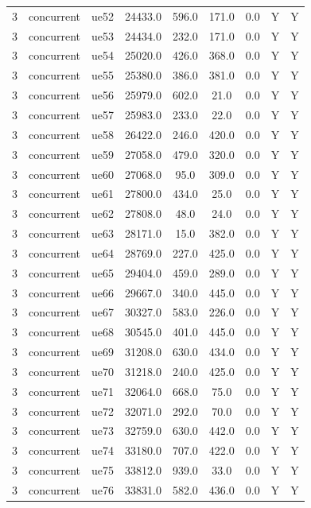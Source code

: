\begin{table}[ht]
\begin{tabular}{|c|c|c|c|c|c|c|c|c|}
3 & concurrent & ue52 & 24433.0 & 596.0 & 171.0 & 0.0 & Y & Y \\
3 & concurrent & ue53 & 24434.0 & 232.0 & 171.0 & 0.0 & Y & Y \\
3 & concurrent & ue54 & 25020.0 & 426.0 & 368.0 & 0.0 & Y & Y \\
3 & concurrent & ue55 & 25380.0 & 386.0 & 381.0 & 0.0 & Y & Y \\
3 & concurrent & ue56 & 25979.0 & 602.0 & 21.0 & 0.0 & Y & Y \\
3 & concurrent & ue57 & 25983.0 & 233.0 & 22.0 & 0.0 & Y & Y \\
3 & concurrent & ue58 & 26422.0 & 246.0 & 420.0 & 0.0 & Y & Y \\
3 & concurrent & ue59 & 27058.0 & 479.0 & 320.0 & 0.0 & Y & Y \\
3 & concurrent & ue60 & 27068.0 & 95.0 & 309.0 & 0.0 & Y & Y \\
3 & concurrent & ue61 & 27800.0 & 434.0 & 25.0 & 0.0 & Y & Y \\
3 & concurrent & ue62 & 27808.0 & 48.0 & 24.0 & 0.0 & Y & Y \\
3 & concurrent & ue63 & 28171.0 & 15.0 & 382.0 & 0.0 & Y & Y \\
3 & concurrent & ue64 & 28769.0 & 227.0 & 425.0 & 0.0 & Y & Y \\
3 & concurrent & ue65 & 29404.0 & 459.0 & 289.0 & 0.0 & Y & Y \\
3 & concurrent & ue66 & 29667.0 & 340.0 & 445.0 & 0.0 & Y & Y \\
3 & concurrent & ue67 & 30327.0 & 583.0 & 226.0 & 0.0 & Y & Y \\
3 & concurrent & ue68 & 30545.0 & 401.0 & 445.0 & 0.0 & Y & Y \\
3 & concurrent & ue69 & 31208.0 & 630.0 & 434.0 & 0.0 & Y & Y \\
3 & concurrent & ue70 & 31218.0 & 240.0 & 425.0 & 0.0 & Y & Y \\
3 & concurrent & ue71 & 32064.0 & 668.0 & 75.0 & 0.0 & Y & Y \\
3 & concurrent & ue72 & 32071.0 & 292.0 & 70.0 & 0.0 & Y & Y \\
3 & concurrent & ue73 & 32759.0 & 630.0 & 442.0 & 0.0 & Y & Y \\
3 & concurrent & ue74 & 33180.0 & 707.0 & 422.0 & 0.0 & Y & Y \\
3 & concurrent & ue75 & 33812.0 & 939.0 & 33.0 & 0.0 & Y & Y \\
3 & concurrent & ue76 & 33831.0 & 582.0 & 436.0 & 0.0 & Y & Y \\

\end{tabular}
\end{table}
